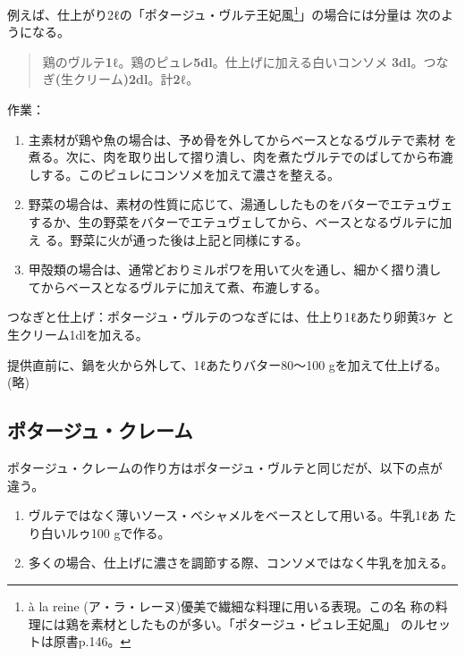 例えば、仕上がり2ℓの「ポタージュ・ヴルテ王妃風\footnote{à la reine
  (ア・ラ・レーヌ)優美で繊細な料理に用いる表現。この名
  称の料理には鶏を素材としたものが多い。「ポタージュ・ピュレ王妃風」
  のルセットは原書p.146。}」の場合には分量は 次のようになる。

\begin{quote}
鶏のヴルテ\textbf{1}ℓ。鶏のピュレ\textbf{5dl}。仕上げに加える白いコンソメ
\textbf{3dl}。つなぎ\textbf{(}生クリーム\textbf{)2dl}。計\textbf{2}ℓ。
\end{quote}

作業：

\begin{enumerate}
\def\labelenumi{(\arabic{enumi})}
\item
  主素材が鶏や魚の場合は、予め骨を外してからベースとなるヴルテで素材
  を煮る。次に、肉を取り出して摺り潰し、肉を煮たヴルテでのばしてから布漉
  しする。このピュレにコンソメを加えて濃さを整える。
\item
  野菜の場合は、素材の性質に応じて、湯通ししたものをバターでエテュヴェ
  するか、生の野菜をバターでエテュヴェしてから、ベースとなるヴルテに加え
  る。野菜に火が通った後は上記と同様にする。
\item
  甲殻類の場合は、通常どおりミルポワを用いて火を通し、細かく摺り潰し
  てからベースとなるヴルテに加えて煮、布漉しする。
\end{enumerate}

つなぎと仕上げ：ポタージュ・ヴルテのつなぎには、仕上り1ℓあたり卵黄3ヶ
と生クリーム1dlを加える。

提供直前に、鍋を火から外して、1ℓあたりバター80〜100 gを加えて仕上げる。
(略)

\hypertarget{ux30ddux30bfux30fcux30b8ux30e5ux30afux30ecux30fcux30e0}{%
\subsection{ポタージュ・クレーム}\label{ux30ddux30bfux30fcux30b8ux30e5ux30afux30ecux30fcux30e0}}


ポタージュ・クレームの作り方はポタージュ・ヴルテと同じだが、以下の点が
違う。

\begin{enumerate}
\def\labelenumi{(\arabic{enumi})}
\item
  ヴルテではなく薄いソース・ベシャメルをベースとして用いる。牛乳1ℓあ
  たり白いルゥ100 gで作る。
\item
  多くの場合、仕上げに濃さを調節する際、コンソメではなく牛乳を加える。
\end{enumerate}

